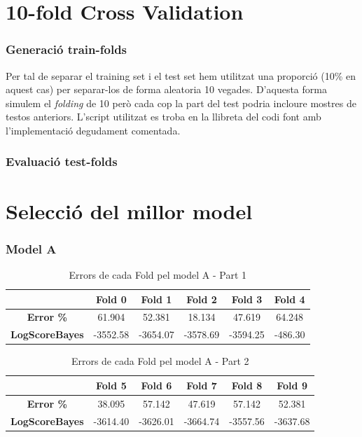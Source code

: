 \documentclass[11pt,a4paper]{article}
\begin{document}
\newpage

\part{10-fold Cross Validation}
\section{Generació train-folds}
Per tal de separar el training set i el test set hem utilitzat una proporció (10\% en aquest cas) per separar-los de forma aleatoria 10 vegades. D'aquesta forma simulem el \textit{folding} de 10 però cada cop la part del test podria incloure mostres de testos anteriors. L'script utilitzat es troba en la llibreta del codi font amb l'implementació degudament comentada.

\section{Evaluació test-folds}
\newpage

\part{Selecció del millor model}
\section{Model A}
\vspace*{0.5in}

\begin{table}[htbp]
\center
\begin{tabular}{|c||c|c|c|c|c|}
\hline
 & Fold 0 & Fold 1 & Fold 2 & Fold 3 & Fold 4 \\
\hline \hline
\textbf{Error \%}
 & 61.904 & 52.381 & 18.134 & 47.619 & 64.248\\
\hline
\textbf{LogScoreBayes} 
 & -3552.58 & -3654.07 & -3578.69 & -3594.25 & -486.30  \\
\hline
\end{tabular}
\caption{Errors de cada Fold pel model A - Part 1}
\end{table}

\vspace*{0.5in}

\begin{table}[htbp]
\center
\begin{tabular}{|c||c|c|c|c|c|}
\hline
 & Fold 5 & Fold 6 & Fold 7 & Fold 8 & Fold 9 \\
\hline \hline
\textbf{Error \%}
 & 38.095 & 57.142 & 47.619 & 57.142 & 52.381\\
\hline
\textbf{LogScoreBayes} 
 & -3614.40 & -3626.01 & -3664.74 & -3557.56 & -3637.68 \\
\hline
\end{tabular}
\caption{Errors de cada Fold pel model A - Part 2}
\end{table}
\end{document}
